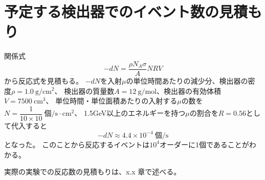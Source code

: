 \section{予定する検出器でのイベント数の見積もり}
関係式
\begin{equation}
    -dN =\dfrac{\rho N_A \sigma }{A}NRV
\end{equation}
から反応式を見積もる。
$-dN$を入射$\mu$の単位時間あたりの減少分、検出器の密度$\rho = 1.0 \ \mathrm{g/cm^2}$、
検出器の質量数$A = 12 \ \mathrm{g/mol}$、検出器の有効体積$V = 7500 \ \mathrm{cm^3}$、
単位時間・単位面積あたりの入射する$\mu$の数を$N = \dfrac{1}{10\times 10} \ \mathrm{個/s\cdot cm^2}$、
1.5GeV以上のエネルギーを持つ$\mu$の割合を$R = 0.56$として代入すると
\begin{equation}
    -dN \approx 4.4 \times 10^{-4} \ \mathrm{個/s}
\end{equation}
となった。
このことから反応するイベントは$10^4$オーダーに1個であることがわかる。

実際の実験での反応数の見積もりは、x.x 章で述べる。